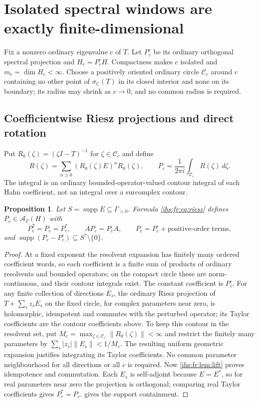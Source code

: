 \documentclass[11pt,a4paper]{article}
\numberwithin{equation}{section}
\newtheorem{proposition}[proposition]{Proposition}
\theoremstyle{definition}
\theoremstyle{remark}
\newcommand{\C}{\mathbb C}
\newcommand{\Ahh}{\mathcal A_\Gamma(H)}
\newcommand{\supp}{\operatorname{supp}}
\newcommand{\norm}[1]{\lVert#1\rVert}
\begin{document}
\section{Isolated spectral windows are exactly finite-dimensional}\label{ihs:fr:sec:clusters}

Fix a nonzero ordinary eigenvalue $c$ of $T$. Let $P^\circ_c$ be its ordinary
orthogonal spectral projection and $H_c=P^\circ_cH$. Compactness makes $c$
isolated and $m_c=\dim H_c<\infty$. Choose a positively oriented ordinary
circle $\mathcal C_c$ around $c$ containing no other point of $\sigma_\C(T)$
in its closed interior and none on its boundary; its radius may shrink as
$c\to0$, and no common radius is required.

\subsection{Coefficientwise Riesz projections and direct rotation}\label{ihs:fr:sec:riesz}
Put $R_0(\zeta)=(\zeta I-T)^{-1}$ for $\zeta\in\mathcal C_c$ and define
\begin{equation}\label{ihs:fr:eq:riesz}
 R(\zeta)=\sum_{n\ge0}(R_0(\zeta)E)^nR_0(\zeta),\qquad
 P_c=\frac1{2\pi i}\int_{\mathcal C_c}R(\zeta)\,d\zeta.
\end{equation}
The integral is an ordinary bounded-operator-valued contour integral of each
Hahn coefficient, not an integral over a surcomplex contour.

\begin{proposition}\label{ihs:fr:prop:riesz}
Let $S=\supp E\subseteq\Gamma_{>0}$. Formula \eqref{ihs:fr:eq:riesz} defines
$P_c\in\Ahh$ with
\[
 P_c^2=P_c=P_c^*,\qquad AP_c=P_cA,\qquad
 P_c=P^\circ_c+\text{positive-order terms},
\]
and $\supp(P_c-P^\circ_c)\subseteq S^*\setminus\{0\}$.
\end{proposition}
\begin{proof}
At a fixed exponent the resolvent expansion has finitely many ordered
coefficient words, so each coefficient is a finite sum of products of
ordinary resolvents and bounded operators; on the compact circle these are
norm-continuous, and their contour integrals exist. The constant coefficient
is $P^\circ_c$. For any finite collection of directions $E_s$, the ordinary
Riesz projection of $T+\sum_sz_sE_s$ on the fixed circle, for complex
parameters near zero, is holomorphic, idempotent and commutes with the
perturbed operator; its Taylor coefficients are the contour coefficients
above. To keep this contour in the resolvent set, put
$M_c=\max_{\zeta\in\mathcal C_c}\norm{R_0(\zeta)}<\infty$ and restrict the
finitely many parameters by $\sum_s|z_s|\norm{E_s}<1/M_c$. The resulting
uniform geometric expansion justifies integrating its Taylor coefficients.
No common parameter neighbourhood for all directions or all $c$ is required.
Now \cref{ihs:fr:lem:lift} proves idempotence and commutation. Each
$E_s$ is self-adjoint because $E=E^*$, so for real parameters near zero the
projection is orthogonal; comparing real Taylor coefficients gives
$P_c^*=P_c$.  gives the support containment.
\end{proof}
\end{document}
